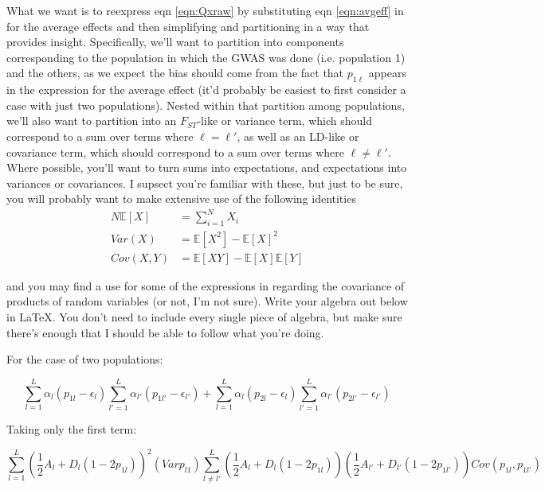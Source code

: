\documentclass[a4paper,10pt]{article}
\begin{document}
What we want is to reexpress eqn \eqref{eqn:Qxraw} by substituting eqn \eqref{eqn:avgeff} in for the average effects and then simplifying and partitioning in a way that provides insight. Specifically, we'll want to partition into components corresponding to the population in which the GWAS was done (i.e. population 1) and the others, as we expect the bias should come from the fact that $p_{1\ell}$ appears in the expression for the average effect (it'd probably be easiest to first consider a case with just two populations). Nested within that partition among populations, we'll also want to partition into an $F_{ST}$-like or variance term, which should correspond to a sum over terms where $\ell = \ell\prime$, as well as an LD-like or covariance term, which should correspond to a sum over terms where $\ell \neq \ell\prime$. Where possible, you'll want to turn sums into expectations, and expectations into variances or covariances. I supsect you're familiar with these, but just to be sure, you will probably want to make extensive use of the following identities
\begin{align}
  N \mathbb{E}[X] &= \sum_{i=1}^N X_i \\
  Var(X) &= \mathbb{E}[X^2] - \mathbb{E}[X]^2 \\
  Cov(X,Y) &= \mathbb{E}[XY] - \mathbb{E}[X]\mathbb{E}[Y]
\end{align}

and you may find a use for some of the expressions in
\cite{Bohrnstedt:1969cz} regarding the covariance of products of
random variables (or not, I'm not sure). Write your algebra out below
in \LaTeX. You don't need to include every single piece of algebra,
but make sure there's enough that I should be able to follow what
you're doing.

For the case of two populations:

\begin{equation}
  \label{1}
  \sum_{l=1}^L \alpha_l (p_{1l}-\epsilon_l) \sum_{l'=1}^L \alpha_{l'} (p_{1l'} - \epsilon_{l'}) + \sum_{l=1}^L \alpha_l (p_{2l}-\epsilon_l) \sum_{l'=1}^L \alpha_{l'} (p_{2l'} - \epsilon_{l'}) 
\end{equation}

Taking only the first term:

\begin{equation}
  \label{2}
  \sum_{l=1}^L (\frac{1}{2}A_l + D_l(1-2p_{1l}))^2 (Var p_{l1}) \sum_{l \neq l'}^L (\frac{1}{2}A_l + D_l(1-2p_{1l}))(\frac{1}{2}A_{l'} + D_{l'}(1-2p_{1l'}))Cov(p_{1l}, p_{1l'})
\end{equation}
\end{document}
